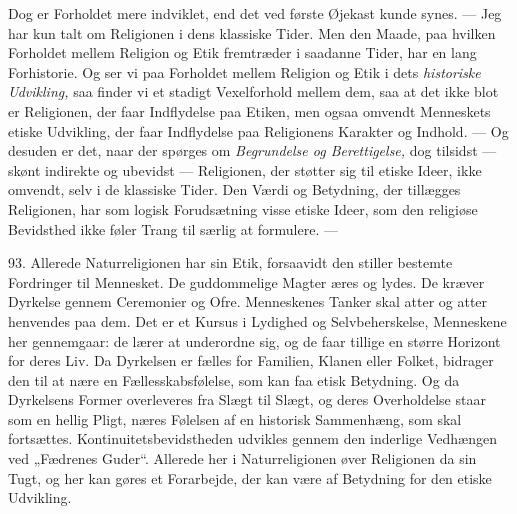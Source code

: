\documentclass[12pt,a4paper,openany]{book}
\newcommand{\opage}[1]{\marginnote{\footnotesize\textit{[#1]}}}
\begin{document}
Dog er Forholdet mere indviklet, end det ved første Øjekast kunde synes.
--- Jeg har kun talt om Religionen i dens klassiske Tider. Men den
Maade, paa hvilken Forholdet mellem Religion og Etik fremtræder i
saadanne Tider, har en lang Forhistorie. Og ser vi paa Forholdet mellem
Religion og Etik i dets \textit{historiske Udvikling,} saa finder vi et
stadigt Vexelforhold mellem dem, saa at det ikke blot er Religionen, der
faar Indflydelse paa Etiken, men ogsaa omvendt Menneskets etiske
Udvikling, der faar Indflydelse paa Religionens Karakter og Indhold. ---
Og desuden er det, naar der spørges om \textit{Begrundelse og
Berettigelse,} dog tilsidst --- skønt indirekte og ubevidst ---
Religionen, der støtter sig til etiske Ideer, ikke omvendt, selv i de
klassiske Tider. Den Værdi og Betydning, der tillægges Religionen, har
som logisk
\opage{212}Forudsætning visse etiske Ideer, som den religiøse Bevidsthed
ikke føler Trang til særlig at formulere. ---

93. Allerede Naturreligionen har sin Etik, forsaavidt den stiller
bestemte Fordringer til Mennesket. De guddommelige Magter æres og lydes.
De kræver Dyrkelse gennem Ceremonier og Ofre. Menneskenes Tanker skal
atter og atter henvendes paa dem. Det er et Kursus i Lydighed og
Selvbeherskelse, Menneskene her gennemgaar: de lærer at underordne sig,
og de faar tillige en større Horizont for deres Liv. Da Dyrkelsen er
fælles for Familien, Klanen eller Folket, bidrager den til at nære en
Fællesskabsfølelse, som kan faa etisk Betydning. Og da Dyrkelsens Former
overleveres fra Slægt til Slægt, og deres Overholdelse staar som en
hellig Pligt, næres Følelsen af en historisk Sammenhæng, som skal
fortsættes. Kontinuitetsbevidstheden udvikles gennem den inderlige
Vedhængen ved „Fædrenes Guder“. Allerede her i Naturreligionen øver
Religionen da sin Tugt, og her kan gøres et Forarbejde, der kan være af
Betydning for den etiske Udvikling.
\end{document}
